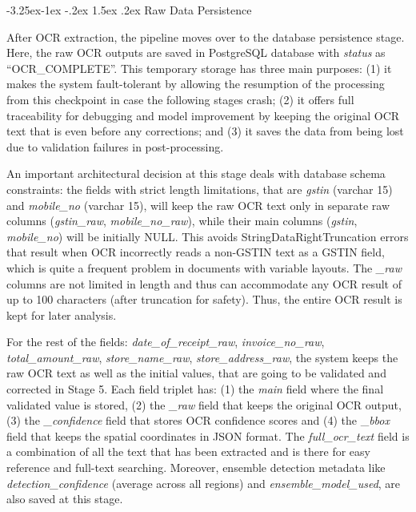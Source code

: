 \documentclass[conference,twocolumn]{IEEEtran}
\makeatletter
\renewcommand{\subsection}{\@startsection{subsection}{2}{\z@}%
  {-3.25ex\@plus -1ex \@minus -.2ex}%
  {1.5ex \@plus .2ex}%
  {\normalfont\normalsize\bfseries\itshape}}
\makeatother
\begin{document}
\subsection{Raw Data Persistence}

After OCR extraction, the pipeline moves over to the database persistence
stage. Here, the raw OCR outputs are saved in PostgreSQL database with
\textit{status} as ``OCR\_COMPLETE''. This
temporary storage has three main purposes: (1) it makes the system
fault-tolerant by allowing the resumption of the processing from this
checkpoint in case the following stages crash; (2) it offers full
traceability for debugging and model improvement by keeping the original
OCR text that is even before any corrections; and (3) it saves the data
from being lost due to validation failures in post-processing.

An important architectural decision at this stage deals with database
schema constraints: the fields with strict length limitations, that are
\textit{gstin} (varchar 15) and \textit{mobile\_no} (varchar 15), will keep
the raw OCR text only in separate raw columns (\textit{gstin\_raw},
\textit{mobile\_no\_raw}), while their main columns (\textit{gstin},
\textit{mobile\_no}) will be initially NULL. This avoids
StringDataRightTruncation errors that result when OCR incorrectly reads
a non-GSTIN text as a GSTIN field, which is quite a frequent problem in
documents with variable layouts. The \textit{\_raw} columns are not
limited in length and thus can accommodate any OCR result of up to 100
characters (after truncation for safety). Thus, the entire OCR result is
kept for later analysis.

For the rest of the fields: \textit{date\_of\_receipt\_raw},
\textit{invoice\_no\_raw}, \textit{total\_amount\_raw},
\textit{store\_name\_raw}, \textit{store\_address\_raw}, the system keeps
the raw OCR text as well as the initial values, that are going to be
validated and corrected in Stage 5. Each field triplet has: (1) the
\textit{main} field where the final validated value is stored, (2) the
\textit{\_raw} field that keeps the original OCR output, (3) the
\textit{\_confidence} field that stores OCR confidence scores and (4) the
\_\textit{bbox} field that keeps the spatial coordinates in JSON format.
The \textit{full\_ocr\_text} field is a combination of all the text that
has been extracted and is there for easy reference and full-text
searching. Moreover, ensemble detection metadata like
\textit{detection\_confidence} (average across all regions) and
\textit{ensemble\_model\_used}, are also saved at this stage.
\end{document}
